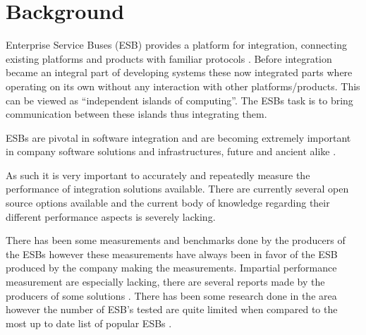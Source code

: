 \documentclass{llncs}
\begin{document}
\section{Background}
\label{sec:background}


Enterprise Service Buses (ESB) provides a platform for integration, connecting existing platforms and products with familiar protocols \cite{falko07} . Before integration became an integral part of developing systems these now integrated parts where operating on its own without any interaction with other platforms/products. This can be viewed as ``independent islands of computing''. The ESBs task is to bring communication between these islands thus integrating them.

ESBs are pivotal in software integration and are becoming extremely important in company software solutions and infrastructures, future and ancient alike \cite{fenner03}.

As such it is very important to accurately and repeatedly measure the performance of integration solutions available. 
There are currently several open source options available \cite{mehta11} and the current body of knowledge regarding their different performance aspects is severely lacking. 


There has been some measurements and benchmarks done by the producers of the ESBs however these measurements have always been in favor of the ESB produced by the company making the measurements. 
Impartial performance measurement are especially lacking, there are several reports made by the producers of some solutions \cite{Perera07,mulevsjboss,mulevsglassfish,mulevsservicemix,mulesoft08}.
There has been some research done in the area \cite{Sanjay2011} however the number of ESB's tested are quite limited when compared to the most up to date list of popular ESBs \cite{mehta11}.
\end{document}
